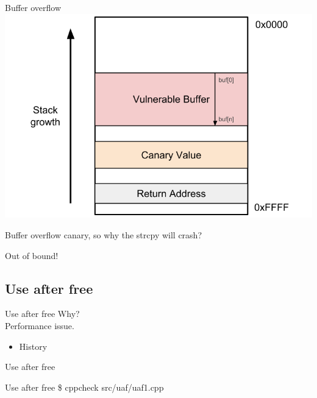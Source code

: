 \documentclass{beamer}
\begin{document}
\begin{CJK*}{UTF8}{bsmi}
    \begin{frame}{Buffer overflow}
        \includegraphics[width=.9\textwidth]{canary.png}
    \end{frame}

    \begin{frame}{Buffer overflow}
        canary, so why the strcpy will crash?
        
    \end{frame}

    \begin{frame}
        \centering
        \Huge Out of bound!
    \end{frame}

    \subsection{Use after free}
    \begin{frame}{Use after free}
        Why?\\
        Performance issue.
        \begin{itemize}
            \item History
        \end{itemize}
    \end{frame}

    \begin{frame}{Use after free}
        
    \end{frame}

    \begin{frame}{Use after free}
        \$ cppcheck src/uaf/uaf1.cpp
        
    \end{frame}


\end{CJK*}
\end{document}
